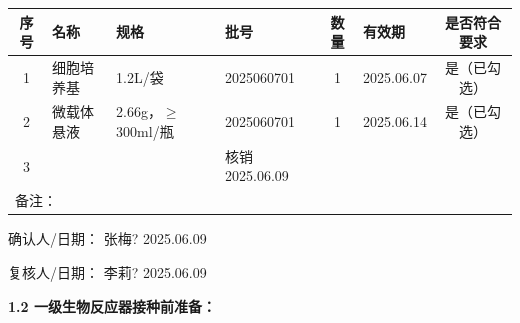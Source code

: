 \documentclass[UTF8,10pt,a4paper,fontset=fandol]{ctexart}
\newcommand{\fieldvalue}[1]{#1}
\newcommand{\handwritten}[1]{#1}
\begin{document}
\begin{tabularx}{\textwidth}{|c|X|X|X|c|X|c|}
\hline
序号 & 名称 & 规格 & 批号 & 数量 & 有效期 & 是否符合要求\\
\hline
1 & 细胞培养基 & 1.2L/袋 &
\fieldvalue{\handwritten{2025060701}} &
\fieldvalue{\handwritten{1}} &
\fieldvalue{\handwritten{2025.06.07}} &
\fieldvalue{是（已勾选）}\\
\hline
2 & 微载体悬液 & 2.66g，$\geq$300ml/瓶 &
\fieldvalue{\handwritten{2025060701}} &
\fieldvalue{\handwritten{1}} &
\fieldvalue{\handwritten{2025.06.14}} &
\fieldvalue{是（已勾选）}\\
\hline
3 & & &
\fieldvalue{\handwritten{核销 2025.06.09}} & & & \\
\hline
\multicolumn{7}{|l|}{备注：\hspace{0.8\textwidth}}\\
\hline
\end{tabularx}

\noindent
确认人/日期：
\fieldvalue{\handwritten{张梅?}}
\hfill
\fieldvalue{\handwritten{2025.06.09}}

\noindent
复核人/日期：
\fieldvalue{\handwritten{李莉?}}
\hfill
\fieldvalue{\handwritten{2025.06.09}}

\medskip
\noindent
\textbf{1.2 一级生物反应器接种前准备：}
\end{document}
